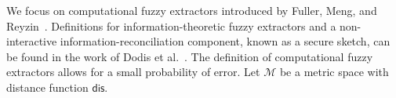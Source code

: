 \documentclass[11pt]{article}
\newcommand{\class}[1]{{\ensuremath{\mathsf{#1}}}}
\newcommand{\gen}{\ensuremath{\class{Gen}}\xspace}
\newcommand{\rep}{\ensuremath{\class{Rep}}\xspace}
\newcommand{\sketch}{\ensuremath{\class{SS}}\xspace}
\newcommand{\rec}{\ensuremath{\class{Rec}}\xspace}
\newcommand{\dis}{\ensuremath{\mathsf{dis}}}
\newtheorem{definition}[theorem]{Definition}
\begin{document}
We focus on computational fuzzy extractors introduced by Fuller, Meng, and Reyzin~\cite{fuller2013computational}.  Definitions for information-theoretic fuzzy extractors and a non-interactive information-reconciliation component, known as a secure sketch, can be found in the work of Dodis et al.~\cite[Sections 2.5--4.1]{DBLP:journals/siamcomp/DodisORS08}.  The definition of computational fuzzy extractors allows for a small probability of error.  Let $\mathcal{M}$ be a metric space with distance function $\dis$.  
%
\end{document}
